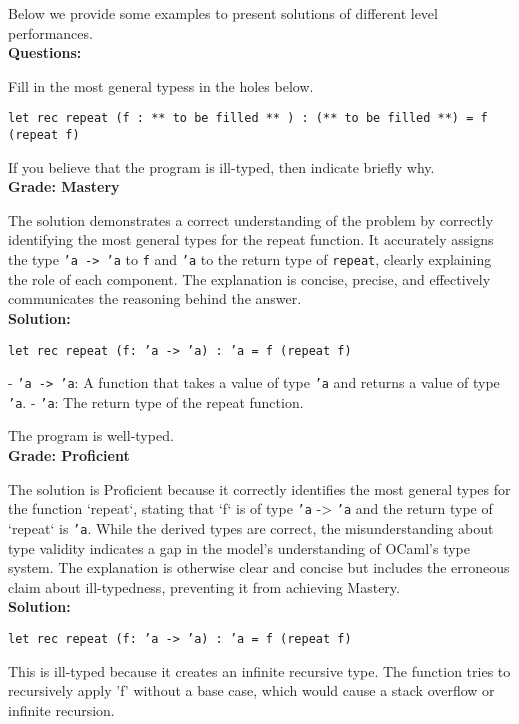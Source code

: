 Below we provide some examples to present solutions of different level performances.
\\


\textbf{Questions:}

Fill in the most general typess in the holes below.

\texttt{let rec repeat (f :  ** to be filled ** ) : (** to be filled **) = f (repeat f)}

If you believe that the program is ill-typed, then indicate briefly why.
\\



\textbf{Grade: Mastery}

The solution demonstrates a correct understanding of the problem by correctly identifying the most general types for the repeat function. It accurately assigns the type \texttt{'a -> 'a} to \texttt{f} and \texttt{'a} to the return type of \texttt{repeat}, clearly explaining the role of each component. The explanation is concise, precise, and effectively communicates the reasoning behind the answer.
\\

\textbf{Solution:}


\texttt{let rec repeat (f: 'a -> 'a) : 'a = f (repeat f)}


- \texttt{'a -> 'a}: A function that takes a value of type \texttt{'a} and returns a value of type \texttt{'a}.
- \texttt{'a}: The return type of the repeat function.

The program is well-typed.
\\

\textbf{Grade: Proficient}

The solution is Proficient because it correctly identifies the most general types for the function `repeat`, stating that `f` is of type \texttt{'a} -> \texttt{'a} and the return type of `repeat` is \texttt{'a}. While the derived types are correct, the misunderstanding about type validity indicates a gap in the model's understanding of OCaml's type system. The explanation is otherwise clear and concise but includes the erroneous claim about ill-typedness, preventing it from achieving Mastery.
\\

\textbf{Solution:}


\texttt{let rec repeat (f: 'a -> 'a) : 'a = f (repeat f)}


This is ill-typed because it creates an infinite recursive type. The function tries to recursively apply 'f' without a base case, which would cause a stack overflow or infinite recursion.
\\


